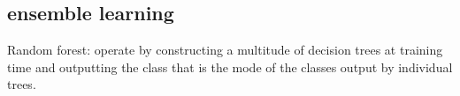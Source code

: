 \subsection{ensemble learning}

Random forest: operate by constructing a multitude of decision trees at training time and outputting the class that is the mode of the classes output by individual trees. 
